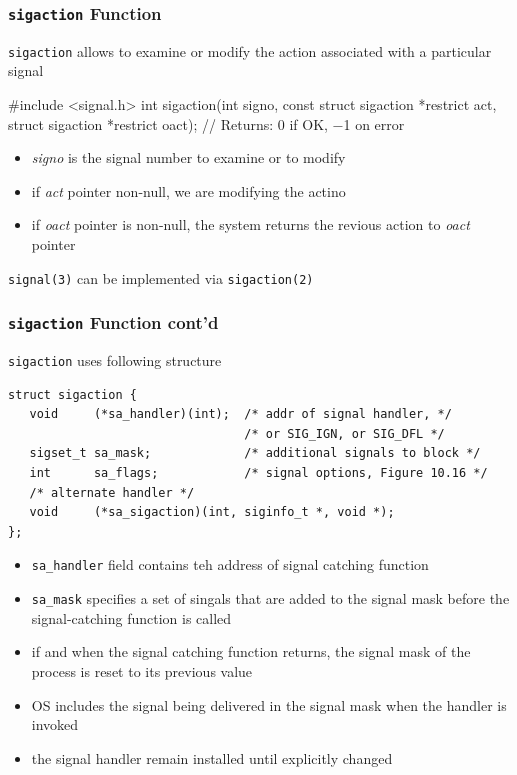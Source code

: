 \documentclass[newPxFont,sthlmFooter,nooffset]{beamer}
\begin{document}
\begin{frame}
  \frametitle{\texttt{sigaction} Function}
\texttt{sigaction} allows to examine or modify the action associated with a particular signal
\begin{codedef}
#include <signal.h>
int sigaction(int signo, const struct sigaction *restrict act,
              struct sigaction *restrict oact);
// Returns: 0 if OK, −1 on error
\end{codedef}

\begin{itemize}
\item \textit{signo} is the signal number to examine or to modify
\item if \textit{act} pointer non-null, we are modifying the actino
\item if \textit{oact} pointer is non-null, the system returns the revious action to \textit{oact} pointer
\end{itemize}

\texttt{signal(3)} can be implemented via \texttt{sigaction(2)}
\end{frame}



\begin{frame}
  \frametitle{\texttt{sigaction} Function cont'd}
\texttt{sigaction} uses following structure
{\footnotesize
\begin{verbatim}
struct sigaction {
   void     (*sa_handler)(int);  /* addr of signal handler, */
                                 /* or SIG_IGN, or SIG_DFL */
   sigset_t sa_mask;             /* additional signals to block */
   int      sa_flags;            /* signal options, Figure 10.16 */
   /* alternate handler */
   void     (*sa_sigaction)(int, siginfo_t *, void *);
};
\end{verbatim}
}
{\footnotesize
\begin{itemize}
\item \texttt{sa\_handler} field contains teh address of signal catching function
\item \texttt{sa\_mask} specifies a set of singals that are added to the signal mask before the signal-catching function is called
\item if and when the signal catching function returns, the signal mask of the process is reset to its previous value
\item OS includes the signal being delivered in the signal mask when the handler is invoked
\item the signal handler remain installed until explicitly changed
\end{itemize}
}
\end{frame}
\end{document}
